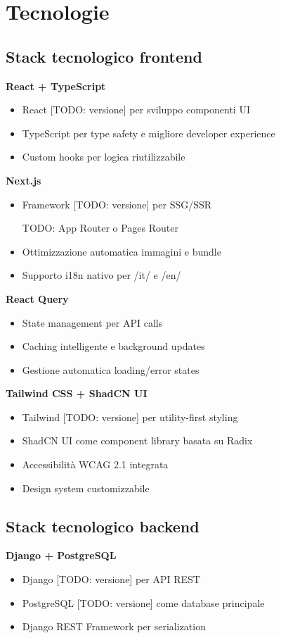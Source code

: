 \chapter{Tecnologie}

\section{Stack tecnologico frontend}
\textbf{React + TypeScript}
\begin{itemize}
  \item React [TODO: versione] per sviluppo componenti UI
  \item TypeScript per type safety e migliore developer experience
  \item Custom hooks per logica riutilizzabile
\end{itemize}

\textbf{Next.js}
\begin{itemize}
  \item Framework [TODO: versione] per SSG/SSR
  \item [TODO: App Router o Pages Router]
  \item Ottimizzazione automatica immagini e bundle
  \item Supporto i18n nativo per /it/ e /en/
\end{itemize}

\textbf{React Query}
\begin{itemize}
  \item State management per API calls
  \item Caching intelligente e background updates
  \item Gestione automatica loading/error states
\end{itemize}

\textbf{Tailwind CSS + ShadCN UI}
\begin{itemize}
  \item Tailwind [TODO: versione] per utility-first styling
  \item ShadCN UI come component library basata su Radix
  \item Accessibilità WCAG 2.1 integrata
  \item Design system customizzabile
\end{itemize}

\section{Stack tecnologico backend}
\textbf{Django + PostgreSQL}
\begin{itemize}
  \item Django [TODO: versione] per API REST
  \item PostgreSQL [TODO: versione] come database principale
  \item Django REST Framework per serialization
\end{itemize}

